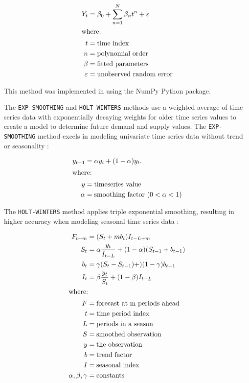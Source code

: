 \begin{align}
    Y_t &= \beta_0 + \sum_{n=1}^N \beta_n t^n + \varepsilon \\
    \intertext{where:}
    t &= \mbox{time index} \nonumber \\
    n &= \mbox{polynomial order} \nonumber \\
    \beta &= \mbox{fitted parameters} \nonumber \\
    \varepsilon &= \mbox{unobserved random error} \nonumber
\end{align}

\noindent
This method was implemented in \deploy using the 
NumPy \cite{oliphant_guide_2006} Python package. 

The \texttt{EXP-SMOOTHING} and \texttt{HOLT-WINTERS} 
methods use a weighted average 
of time-series data with exponentially decaying weights 
for older time series values \cite{hyndman_forecasting:_2018}
to create a model to determine future demand and supply values. 
The \texttt{EXP-SMOOTHING} method excels in 
modeling univariate time series data without trend or seasonality
\cite{hyndman_forecasting:_2018}: 

\begin{align}
    \label{eq:expsm}
    y_{t+1} &= \alpha y_i + (1-\alpha)y_t. \\ 
    \intertext{where:}
    y &= \mbox{timeseries value} \nonumber \\
    \alpha &= \mbox{smoothing factor } (0 < \alpha < 1) \nonumber
\end{align}

\noindent
The \texttt{HOLT-WINTERS} method applies triple exponential 
smoothing, resulting in higher accuracy when 
modeling seasonal time series data 
\cite{sematech_engineering_2006}: 

\begin{align}
    F_{t+m} &= (S_t +mb_t)I_{t-L+m} \\
    S_t &= \alpha \frac{y_t}{I_{t-L}}+(1-\alpha)(S_{t-1}+b_{t-1}) \nonumber \\
    b_t &= \gamma(S_t-S_{t-1})+)(1-\gamma)b_{t-1} \nonumber \\
    I_t &= \beta \frac{y_t}{S_t} + (1-\beta)I_{t-L} \nonumber \\
    \intertext{where:}
    F &= \mbox{forecast at m periods ahead} \nonumber \\
    t &= \mbox{time period index} \nonumber \\
    L &= \mbox{periods in a season} \nonumber \\
    S &= \mbox{smoothed observation} \nonumber \\
    y &= \mbox{the observation} \nonumber \\
    b &= \mbox{trend factor} \nonumber \\
    I &= \mbox{seasonal index} \nonumber \\
    \alpha, \beta, \gamma &= \mbox{constants} \nonumber
\end{align}


